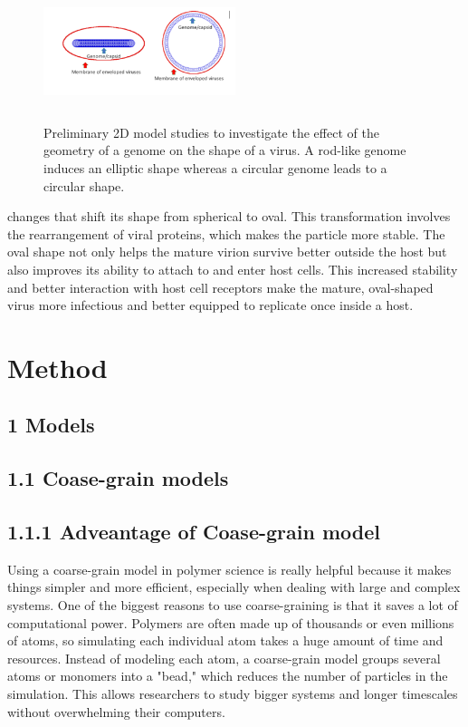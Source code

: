 \documentclass[12pt]{article}
\begin{document}
\begin{flushleft}
\begin{figure}[!ht]
  \centering
  \includegraphics[width=0.5\textwidth,height=4cm]{monkeypox.png}  %
  \caption{Preliminary 2D model studies to
investigate the effect of the geometry of a
genome on the shape of a virus. A rod-like
genome induces an elliptic shape whereas a
circular genome leads to a circular shape.\cite{harish2021}}
\end{figure}

\noindent changes that shift its shape from spherical to oval. This transformation involves the rearrangement of viral proteins, which makes the particle more stable. The oval shape not only helps the mature virion survive better outside the host but also improves its ability to attach to and enter host cells. This increased stability and better interaction with host cell receptors make the mature, oval-shaped virus more infectious and better equipped to replicate once inside a host.

\section*{Method} 
\subsection*{1 Models}
\subsection*{1.1 Coase-grain models}

\subsection*{1.1.1 Adveantage of Coase-grain model}
	Using a coarse-grain model in polymer science is really helpful because it makes things simpler and more efficient, especially when dealing with large and complex systems. One of the biggest reasons to use coarse-graining is that it saves a lot of computational power. Polymers are often made up of thousands or even millions of atoms, so simulating each individual atom takes a huge amount of time and resources. Instead of modeling each atom, a coarse-grain model groups several atoms or monomers into a "bead," which reduces the number of particles in the simulation. This allows researchers to study bigger systems and longer timescales without overwhelming their computers.


\end{flushleft}
\end{document}
